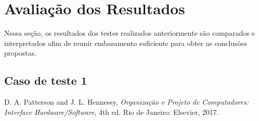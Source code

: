 \documentclass[conference]{IEEEtran}
\begin{document}
\section{Avaliação dos Resultados}
Nessa seção, os resultados dos testes realizados anteriormente são comparados e interpretados afim de reunir embasamento suficiente para obter as conclusões propostas.

\subsection{Caso de teste 1}




\begin{thebibliography}{00}
 D. A. Patterson and J. L. Hennessy, \textit{Organização e Projeto de Computadores: Interface Hardware/Software}, 4th ed. Rio de Janeiro: Elsevier, 2017.
\end{thebibliography}
\end{document}
